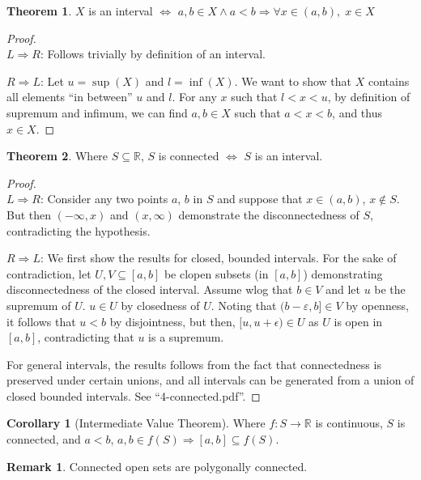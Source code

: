 \documentclass{article}
\theoremstyle{definition}
\newtheorem{thm}{Theorem}[subsubsection]
\newtheorem{rmk}{Remark}[subsubsection]
\newtheorem{cor}{Corollary}[subsubsection]
\begin{document}
\begin{thm}
	$X$ is an interval $\iff$ $a,b\in X\land a<b\Rightarrow \forall x\in(a,b),\;x\in X$
\end{thm}
\begin{proof}
	$ $\\$L\Rightarrow R$: Follows trivially by definition of an interval.\par
	$R\Rightarrow L$: Let $u=\sup(X)$ and $l=\inf(X)$. We want to show that $X$ contains all elements ``in between'' $u$ and $l$. For any $x$ such that $l<x<u$, by definition of supremum and infimum, we can find $a,b\in X$ such that $a<x<b$, and thus $x\in X$.
\end{proof}
\begin{thm}
	Where $S\subseteq \mathbb{R}$, $S$ is connected $\iff$ $S$ is an interval.
\end{thm}
\begin{proof}
	$ $\\$L\Rightarrow R$: Consider any two points $a$, $b$ in $S$ and suppose that $x\in(a,b)$, $x\not\in S$. But then $(-\infty,x)$ and $(x,\infty)$ demonstrate the disconnectedness of $S$, contradicting the hypothesis.\par
	$R\Rightarrow L$: We first show the results for closed, bounded intervals. For the sake of contradiction, let $U,V\subseteq [a,b]$ be clopen subsets (in $[a,b]$) demonstrating disconnectedness of the closed interval. Assume wlog that $b\in V$ and let $u$ be the supremum of $U$. $u\in U$ by closedness of $U$. Noting that $(b-\varepsilon,b]\in V$ by openness, it follows that $u<b$ by disjointness, but then, $[u,u+\epsilon)\in U$ as $U$ is open in $[a,b]$, contradicting that $u$ is a supremum.\par
	For general intervals, the results follows from the fact that connectedness is preserved under certain unions, and all intervals can be generated from a union of closed bounded intervals. See ``4-connected.pdf''.
\end{proof}
\begin{cor}[Intermediate Value Theorem]
	Where $f:S\rightarrow \mathbb{R}$ is continuous, $S$ is connected, and $a<b$, $a,b\in f(S)\Rightarrow [a,b]\subseteq f(S)$.
\end{cor}
\begin{rmk}
	Connected open sets are polygonally connected.
\end{rmk}
\end{document}
